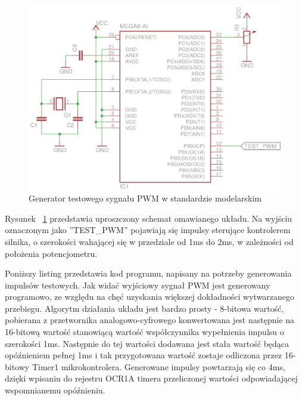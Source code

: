 \begin{figure}[H]
	\centering
	\includegraphics[scale=1]{Pictures/TestSignalGenerator.png}
	\caption[Generator testowego sygnału PWM w standardzie modelarskim]{Generator testowego sygnału PWM w standardzie modelarskim}
	\label{fig:TestSignalGenerator_sch}
\end{figure}

Rysunek ~\ref{fig:TestSignalGenerator_sch} przedstawia uproszczony schemat omawianego układu. Na wyjściu oznaczonym jako ''TEST\_PWM'' pojawiają się impulsy sterujące kontrolerem silnika, o szerokości wahającej się w przedziale od 1ms do 2ms, w zależności od położenia potencjometru.

Poniższy listing przedstawia kod programu, napisany na potrzeby generowania impulsów testowych. Jak widać wyjściowy sygnał PWM jest generowany programowo, ze względu na chęć uzyskania większej dokładności wytwarzanego przebiegu. Algorytm działania układu jest bardzo prosty - 8-bitowa wartość, pobierana z przetwornika analogowo-cyfrowego konwertowana jest następnie na 16-bitową wartość stanowiącą wartość współczynnika wypełnienia impulsu o szerokości 1ms. Następnie do tej wartości dodawana jest stała wartość będąca opóźnieniem pełnej 1ms i tak przygotowana wartość zostaje odliczona przez 16-bitowy Timer1 mikrokontrolera. Generowane impulsy powtarzają się co 4ms, dzięki wpisaniu do rejestru OCR1A timera przeliczonej wartości odpowiadającej wspomnianemu opóźnieniu.

